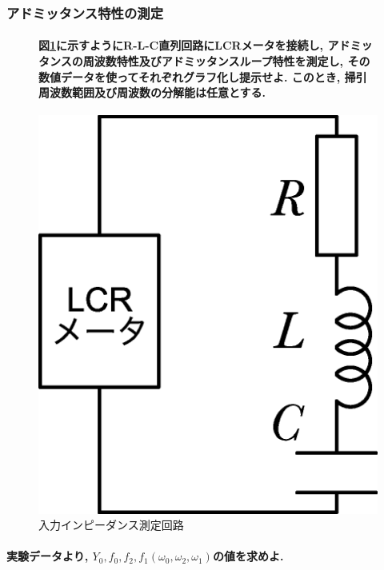 \documentclass[titlepage]{jsarticle}
\begin{document}
        \subsubsection{アドミッタンス特性の測定}
            \begin{figure}[h]
                \begin{minipage}{0.6\hsize}
                    \paragraph{図\ref{fig:rlc_exp}に示すようにR-L-C直列回路にLCRメータを接続し, アドミッタンスの周波数特性及びアドミッタンスループ特性を測定し, その数値データを使ってそれぞれグラフ化し提示せよ. このとき, 掃引周波数範囲及び周波数の分解能は任意とする.}

                    \mbox{}

                \end{minipage}
                \begin{minipage}{0.4\hsize}
                    \centering
                    \includegraphics[width=0.6\hsize]{images/exp.eps}
                    \caption{入力インピーダンス測定回路}
                    \label{fig:rlc_exp}
                \end{minipage}
            \end{figure}

            \paragraph{実験データより, $Y_0, f_0, f_2, f_1 (\omega_0, \omega_2, \omega_1)$の値を求めよ.}
            \mbox{} \\
\end{document}
